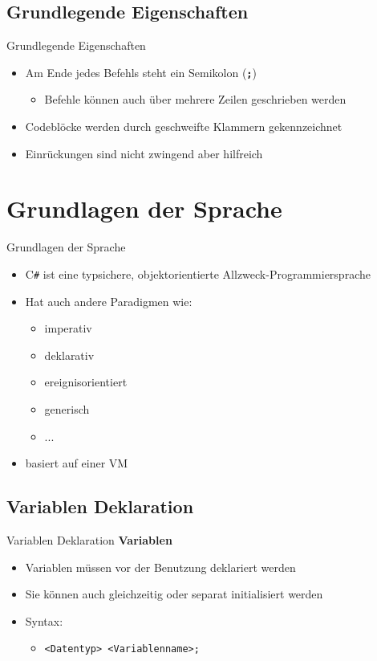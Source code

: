 \subsection{Grundlegende Eigenschaften}
\begin{frame}{Grundlegende Eigenschaften}
	\begin{itemize}
		\item Am Ende jedes Befehls steht ein Semikolon (\texttt{\alert{\textbf{;}}})
		\begin{itemize}
			\item Befehle können auch über mehrere Zeilen geschrieben werden
		\end{itemize}
		\item Codeblöcke werden durch geschweifte Klammern gekennzeichnet
		\item Einrückungen sind nicht zwingend aber hilfreich
	\end{itemize}
\end{frame}

\section{Grundlagen der Sprache}
\begin{frame}{Grundlagen der Sprache}
	\begin{itemize}
		\item C\texttt{\#} ist eine typsichere, objektorientierte Allzweck-Programmiersprache	
		\item Hat auch andere Paradigmen wie:
		\begin{itemize}
			\item imperativ
			\item deklarativ
			\item ereignisorientiert
			\item generisch
			\item ...
		\end{itemize}
		\item basiert auf einer VM
	\end{itemize}	
\end{frame}

\subsection{Variablen Deklaration}
\begin{frame}{Variablen Deklaration}
	\textbf{Variablen}\\
		\begin{itemize}
			\item Variablen müssen vor der Benutzung deklariert werden
			\item Sie können auch gleichzeitig oder separat initialisiert werden
			\item Syntax:
			\begin{itemize}			
				\item \texttt{\alert{<Datentyp> <Variablenname>};}
			\end{itemize}
		\end{itemize}
	
\end{frame}

